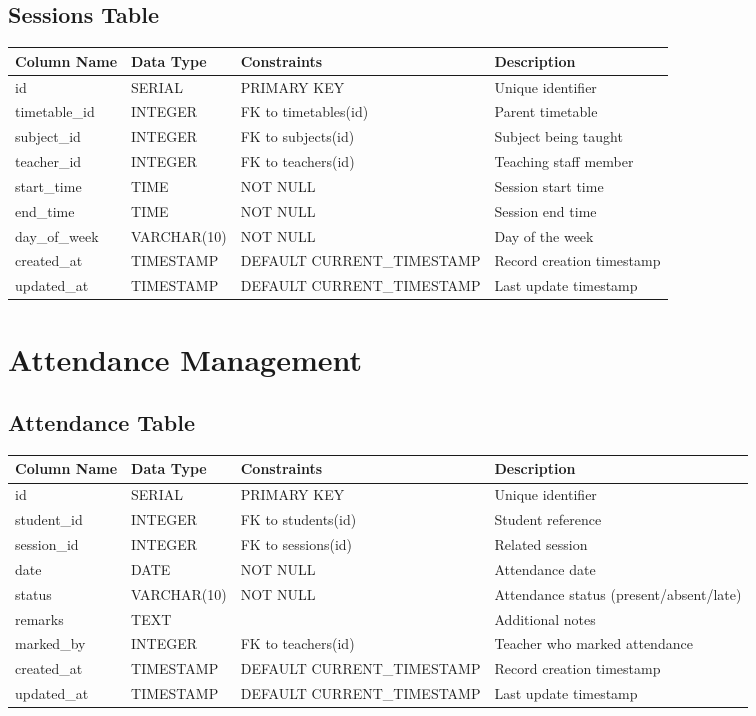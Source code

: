 \documentclass[11pt,a4paper]{article}
\begin{document}
\subsection{Sessions Table}
\begin{longtable}{|p{3.5cm}|p{2.5cm}|p{3cm}|p{5.5cm}|}
\hline
\textbf{Column Name} & \textbf{Data Type} & \textbf{Constraints} & \textbf{Description} \\
\hline
\endhead
id & SERIAL & PRIMARY KEY & Unique identifier \\
\hline
timetable\_id & INTEGER & FK to timetables(id) & Parent timetable \\
\hline
subject\_id & INTEGER & FK to subjects(id) & Subject being taught \\
\hline
teacher\_id & INTEGER & FK to teachers(id) & Teaching staff member \\
\hline
start\_time & TIME & NOT NULL & Session start time \\
\hline
end\_time & TIME & NOT NULL & Session end time \\
\hline
day\_of\_week & VARCHAR(10) & NOT NULL & Day of the week \\
\hline
created\_at & TIMESTAMP & DEFAULT CURRENT\_TIMESTAMP & Record creation timestamp \\
\hline
updated\_at & TIMESTAMP & DEFAULT CURRENT\_TIMESTAMP & Last update timestamp \\
\hline
\end{longtable}

\section{Attendance Management}

\subsection{Attendance Table}
\begin{longtable}{|p{3.5cm}|p{2.5cm}|p{3cm}|p{5.5cm}|}
\hline
\textbf{Column Name} & \textbf{Data Type} & \textbf{Constraints} & \textbf{Description} \\
\hline
\endhead
id & SERIAL & PRIMARY KEY & Unique identifier \\
\hline
student\_id & INTEGER & FK to students(id) & Student reference \\
\hline
session\_id & INTEGER & FK to sessions(id) & Related session \\
\hline
date & DATE & NOT NULL & Attendance date \\
\hline
status & VARCHAR(10) & NOT NULL & Attendance status (present/absent/late) \\
\hline
remarks & TEXT & & Additional notes \\
\hline
marked\_by & INTEGER & FK to teachers(id) & Teacher who marked attendance \\
\hline
created\_at & TIMESTAMP & DEFAULT CURRENT\_TIMESTAMP & Record creation timestamp \\
\hline
updated\_at & TIMESTAMP & DEFAULT CURRENT\_TIMESTAMP & Last update timestamp \\
\hline
\end{longtable}
\end{document}
